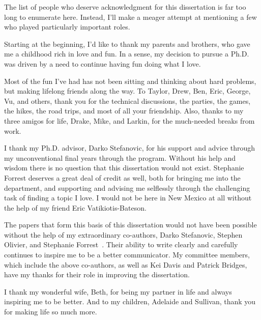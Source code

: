 \documentclass[botnum,letterpaper]{unmeethesis}
\begin{document}
\begin{acknowledgments}
  \vspace{1.1in}
  The list of people who deserve acknowledgment for this dissertation is far too
  long to enumerate here. Instead, I'll make a meager attempt at mentioning a
  few who played particularly important roles. 

  Starting at the beginning, I'd like to thank my parents and brothers, who gave
  me a childhood rich in love and fun. In a sense, my decision to pursue a Ph.D.
  was driven by a need to continue having fun doing what I love.  

  Most of the fun I've had has not been sitting and thinking about hard
  problems, but making lifelong friends along the way. To Taylor, Drew, Ben,
  Eric, George, Vu, and others, thank you for the technical discussions, the
  parties, the games, the hikes, the road trips, and most of all your
  friendship. Also, thanks to my three amigos for life, Drake, Mike, and Larkin,
  for the much-needed breaks from work. 

  I thank my Ph.D. advisor, Darko Stefanovic, for his support and advice through
  my unconventional final years through the program. Without his help and
  wisdom there is no question that this dissertation would not exist. Stephanie
  Forrest deserves a great deal of credit as well, both for bringing me into the
  department, and supporting and advising me selflessly through the challenging
  task of finding a topic I love. I would not be here in New Mexico at all
  without the help of my friend Eric Vatikiotis-Bateson. 

  The papers that form this basis of this dissertation would not have been
  possible without the help of my extraordinary co-authors, Darko Stefanovic,
  Stephen Olivier, and Stephanie Forrest~\cite{cem, verifiably}. Their
  ability to write clearly and carefully continues to inspire me to be a better
  communicator. My committee members, which include the above co-authors, as
  well as Kei Davis and Patrick Bridges, have my thanks for their role in
  improving the dissertation. 

  I thank my wonderful wife, Beth, for being my partner in life and always
  inspiring me to be better. And to my children, Adelaide and Sullivan, thank
  you for making life so much more.
\end{acknowledgments}

\maketitleabstract %
\end{document}
